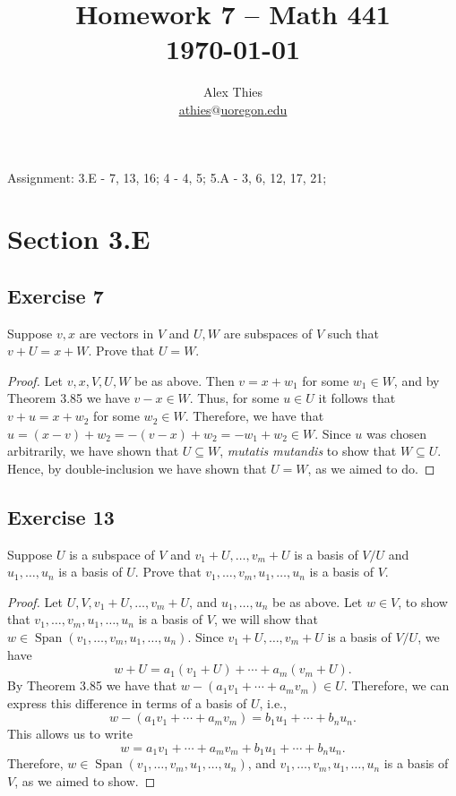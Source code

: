 \documentclass[letterpaper, 12pt]{amsart}
\DeclareMathOperator{\Span}{Span}					%
\theoremstyle{definition}  							%
\begin{document}
	\title{Homework 7  -- Math 441 \\ \today}
	\author{Alex Thies \\ \href{mailto:athies@uoregon.edu}{\lowercase{athies$@$uoregon.edu}}}

	\maketitle

	Assignment: 3.E - 7, 13, 16; 4 - 4, 5; 5.A - 3, 6, 12, 17, 21;

	\section*{Section 3.E}
		\subsection*{Exercise 7}
		Suppose $v, x$ are vectors in $V$ and $U, W$ are subspaces of $V$ such that $v + U = x + W$. 
		Prove that $U = W$.

		\begin{proof}
		Let $v, x, V, U, W$ be as above.
		Then $v = x + w_{1}$ for some $w_{1} \in W$, and by Theorem 3.85 we have $v - x \in W$.
		Thus, for some $u \in U$ it follows that $v + u = x + w_{2}$ for some $w_{2} \in W$.
		Therefore, we have that $u = (x-v) + w_{2} = -(v-x) + w_{2} = -w_{1}+w_{2} \in W$.
		Since $u$ was chosen arbitrarily, we have shown that $U \subseteq W$, \textit{mutatis mutandis} to show that $W \subseteq U$.
		Hence, by double-inclusion we have shown that $U = W$, as we aimed to do.
		\end{proof}

		\subsection*{Exercise 13}
		Suppose $U$ is a subspace of $V$ and $v_{1} + U, \dots, v_{m} + U$ is a basis of $V/U$ and $u_{1}, \dots, u_{n}$ is a basis of $U$. 
		Prove that $v_{1}, \dots, v_{m},u_{1}, \dots, u_{n}$ is a basis of $V$.

		\begin{proof}
		Let $U, V, v_{1} + U, \dots, v_{m} + U$, and $u_{1}, \dots, u_{n}$ be as above.
		Let $w \in V$, to show that $v_{1}, \dots, v_{m},u_{1}, \dots, u_{n}$ is a basis of $V$, we will show that $w \in \Span(v_{1}, \dots, v_{m},u_{1}, \dots, u_{n})$.
		Since $v_{1} + U, \dots, v_{m} + U$ is a basis of $V/U$, we have $$w + U = a_{1}(v_{1} + U) + \cdots + a_{m}(v_{m}+U).$$ By Theorem 3.85 we have that $w - (a_{1}v_{1} + \cdots + a_{m}v_{m}) \in U$.
		Therefore, we can express this difference in terms of a basis of $U$, i.e., $$w - (a_{1}v_{1} + \cdots + a_{m}v_{m}) = b_{1}u_{1} + \cdots + b_{n}u_{n}.$$ 
		This allows us to write $$w = a_{1}v_{1} + \cdots + a_{m}v_{m} + b_{1}u_{1} + \cdots + b_{n}u_{n}.$$ 
		Therefore, $w \in \Span(v_{1}, \dots, v_{m},u_{1}, \dots,u_{n})$, and $v_{1}, \dots, v_{m},u_{1}, \dots, u_{n}$ is a basis of $V$, as we aimed to show.
		\end{proof}
\end{document}
